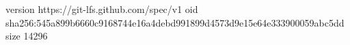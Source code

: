 version https://git-lfs.github.com/spec/v1
oid sha256:545a899b6660c9168744e16a4debd991899d4573d9e15e64e333900059abc5dd
size 14296
